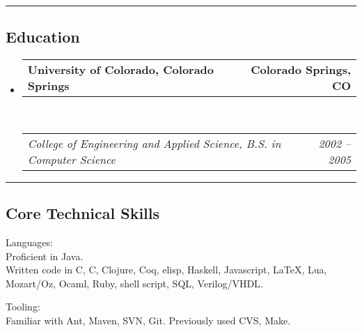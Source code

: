 \documentclass[10pt,letterpaper]{article}
\makeatletter
\newenvironment{indentsection}[1]%
{\begin{list}{}%
	{\setlength{\leftmargin}{#1}}%
	\item[]%
}
{\end{list}}
\newcommand{\headerrow}[2]
{\begin{tabular*}{\linewidth}{l@{\extracolsep{\fill}}r}
	#1 &
	#2 \\
\end{tabular*}}
\newcommand{\CPP}
{C\nolinebreak[4]\hspace{-.05em}\raisebox{.22ex}{\footnotesize\bf ++}}
\makeatother
\begin{document}
\hrule
\vspace{-0.4em}
\subsection*{Education}

\begin{itemize}
	\parskip=0.1em

	\item
	\headerrow
		{\textbf{University of Colorado, Colorado Springs}}
		{\textbf{Colorado Springs, CO}}
	\\
	\headerrow
		{\emph{College of Engineering and Applied Science, B.S. in Computer Science}}
		{\emph{2002 -- 2005}}

\end{itemize}


\hrule
\vspace{-0.4em}
\subsection*{Core Technical Skills}

\begin{indentsection}{\parindent}
\begin{description*}
	\item[Languages:] \ \\
	Proficient in Java. \\
	Written code in C, \CPP, Clojure, Coq, elisp, Haskell, Javascript, \LaTeX, Lua, Mozart/Oz, Ocaml, Ruby, shell script, SQL, Verilog/VHDL.
	\item[Tooling:] \ \\
	Familiar with Ant, Maven, SVN, Git.
	Previously used CVS, Make.
\end{description*}
\end{indentsection}
\end{document}
